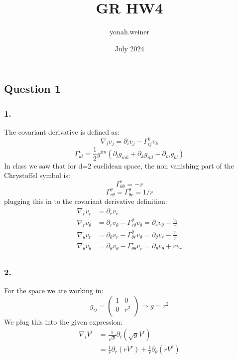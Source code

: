 \documentclass{article}
\title{GR HW4}
\author{yonah.weiner }
\date{July 2024}
\begin{document}
\maketitle

\subsection*{Question 1}
\subsubsection*{1.}
The covariant derivative is defined as:
\begin{equation*}
    \nabla_iv_j=\partial_iv_j-\Gamma^k_{ij}v_k
\end{equation*}
\begin{equation*}
    \Gamma^i_{kl}=\frac{1}{2}g^{im}\left(\partial_l g_{mk}+\partial_k g_{ml}-\partial_m g_{kl}\right)
\end{equation*}
In class we saw that for d=2 euclidean space, the non vanishing part of the Chrystoffel symbol is:
\begin{equation}
    \Gamma^r_{\theta \theta}=-r
\end{equation}
\begin{equation}
    \Gamma^{\theta }_{r \theta}=\Gamma^\theta_{\theta r}=1/r
\end{equation}
plugging this in to the covariant derivative definition:
\begin{equation*}
\begin{split}
\nabla_r v_r &= \partial_rv_r\\
\nabla_r v_\theta &= \partial_r v_\theta  - \Gamma^\theta_{r\theta}v_\theta= \partial_r v_\theta  - \frac{v_\theta}{r}\\
\nabla_\theta v_r &= \partial_\theta v_r  - \Gamma^\theta_{\theta r}v_\theta= \partial_\theta v_r  - \frac{v_r}{r}\\
\nabla_\theta v_\theta &= \partial_\theta v_\theta -\Gamma^r_{\theta\theta}v_r= \partial_\theta v_\theta +rv_r\\
\end{split}
\end{equation*}
\subsubsection*{2.}
For the space we are working in:
\begin{equation*}
    g_{ij}=\begin{pmatrix}
        1 & 0\\
        0 & r^2\\
    \end{pmatrix}\Rightarrow g=r^2
\end{equation*}
We plug this into the given expression:
\begin{equation}
\begin{split}
    \nabla_i V^i
    &=\frac{1}{\sqrt{g}}\partial_i\left(\sqrt{g}V^i\right)\\
    &=\frac{1}{r}\partial_r\left(rV^r\right)+\frac{1}{r}\partial_\theta\left(rV^\theta\right)\\
\end{split}
\end{equation}
\end{document}
